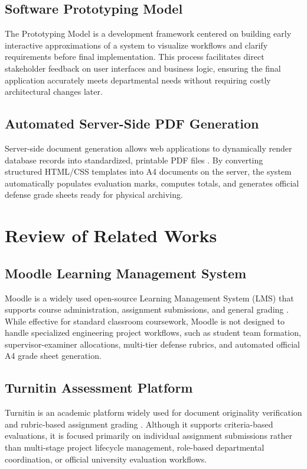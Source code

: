 \subsection{Software Prototyping Model}
The Prototyping Model is a development framework centered on building early interactive approximations of a system to visualize workflows and clarify requirements before final implementation. This process facilitates direct stakeholder feedback on user interfaces and business logic, ensuring the final application accurately meets departmental needs without requiring costly architectural changes later.

\subsection{Automated Server-Side PDF Generation}
Server-side document generation allows web applications to dynamically render database records into standardized, printable PDF files \cite{puppeteer2024headless}. By converting structured HTML/CSS templates into A4 documents on the server, the system automatically populates evaluation marks, computes totals, and generates official defense grade sheets ready for physical archiving.

\section{Review of Related Works}

\subsection{Moodle Learning Management System}
Moodle is a widely used open-source Learning Management System (LMS) that supports course administration, assignment submissions, and general grading \cite{ritzer2022moodle}. While effective for standard classroom coursework, Moodle is not designed to handle specialized engineering project workflows, such as student team formation, supervisor-examiner allocations, multi-tier defense rubrics, and automated official A4 grade sheet generation.

\subsection{Turnitin Assessment Platform}
Turnitin is an academic platform widely used for document originality verification and rubric-based assignment grading \cite{turnitin2024feedback}. Although it supports criteria-based evaluations, it is focused primarily on individual assignment submissions rather than multi-stage project lifecycle management, role-based departmental coordination, or official university evaluation workflows.

